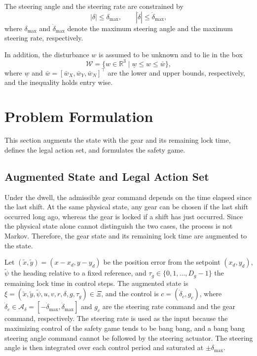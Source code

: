 \documentclass[lettersize,journal]{IEEEtran}
\newcommand{\calA}{\mathcal{A}}
\newcommand{\calW}{\mathcal{W}}
\begin{document}
The steering angle and the steering rate are constrained by
\begin{equation}
|\delta| \le \delta_{\max}, \qquad |\dot{\delta}| \le \dot{\delta}_{\max},
\label{eq_steer}
\end{equation}
where $\delta_{\max}$ and $\dot{\delta}_{\max}$ denote the maximum steering angle and the maximum steering rate, respectively.

In addition, the disturbance $w$ is assumed to be unknown and to lie in the box
\begin{equation}
\calW = \bigl\{ w \in \mathbb{R}^3 \mid \underline{w} \le w \le \bar{w} \bigr\},
\label{eq_wbox}
\end{equation}
where $\underline{w}$ and $\bar{w} = [\bar{w}_X, \bar{w}_Y, \bar{w}_N]^\top$ are the lower and upper bounds, respectively, and the inequality holds entry wise.

\section{Problem Formulation}\label{sec_problem}

This section augments the state with the gear and its remaining lock time, defines the legal action set, and formulates the safety game.

\subsection{Augmented State and Legal Action Set}

Under the dwell, the admissible gear command depends on the time elapsed since the last shift. At the same physical state, any gear can be chosen if the last shift occurred long ago, whereas the gear is locked if a shift has just occurred. Since the physical state alone cannot distinguish the two cases, the process is not Markov. Therefore, the gear state and its remaining lock time are augmented to the state.

Let $(\tilde{x}, \tilde{y}) = (x - x_d, y - y_d)$ be the position error from the setpoint $(x_d, y_d)$, $\tilde{\psi}$ the heading relative to a fixed reference, and $\tau_g \in \{0, 1, \ldots, D_g - 1\}$ the remaining lock time in control steps. The augmented state is $\xi = (\tilde{x}, \tilde{y}, \tilde{\psi}, u, v, r, \delta, g, \tau_g) \in \Xi$, and the control is $c = (\dot{\delta}_c, g_c)$, where $\dot{\delta}_c \in \calA_\delta = [-\dot{\delta}_{\max}, \dot{\delta}_{\max}]$ and $g_c$ are the steering rate command and the gear command, respectively. The steering rate is used as the input because the maximizing control of the safety game tends to be bang bang, and a bang bang steering angle command cannot be followed by the steering actuator. The steering angle is then integrated over each control period and saturated at $\pm\delta_{\max}$.
\end{document}
